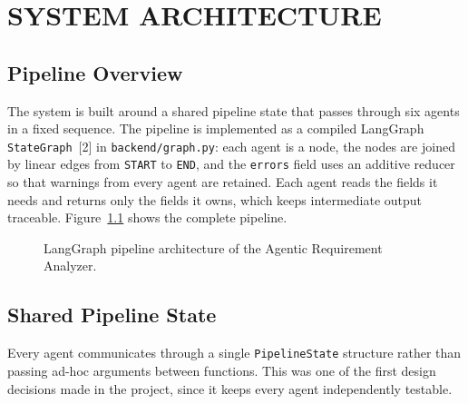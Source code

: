 \documentclass[12pt,a4paper,openany]{report}
\begin{document}
\chapter{SYSTEM ARCHITECTURE}

\section{Pipeline Overview}
The system is built around a shared pipeline state that passes through six
agents in a fixed sequence. The pipeline is implemented as a compiled
LangGraph \texttt{StateGraph}~[2] in \texttt{backend/graph.py}: each agent is a node,
the nodes are joined by linear edges from \texttt{START} to \texttt{END}, and the
\texttt{errors} field uses an additive reducer so that warnings from every
agent are retained. Each agent reads the fields it needs and returns only
the fields it owns, which keeps intermediate output traceable.
Figure~\ref{fig:architecture} shows the complete pipeline.

\begin{figure}[H]
\centering
{}
\caption{LangGraph pipeline architecture of the Agentic Requirement Analyzer.}
\label{fig:architecture}
\end{figure}

\section{Shared Pipeline State}
Every agent communicates through a single \texttt{PipelineState}
structure rather than passing ad-hoc arguments between functions. This
was one of the first design decisions made in the project, since it keeps
every agent independently testable.
\end{document}
